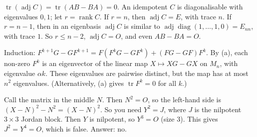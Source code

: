\documentclass[11pt,a4paper]{article}
\begin{document}
\(\operatorname{tr}(\operatorname{adj}C)=\operatorname{tr}(AB-BA)=0\). An idempotent \(C\) is diagonalisable with eigenvalues \(0,1\); let \(r=\operatorname{rank}C\).
If \(r=n\), then \(\operatorname{adj}C=E\), with trace \(n\). If \(r=n-1\), then in an eigenbasis \(\operatorname{adj}C\) is similar to \(\operatorname{adj}\operatorname{diag}(1,\dots,1,0)=E_{nn}\), with trace \(1\). So \(r\le n-2\), \(\operatorname{adj}C=O\), and even \(AB-BA=O\).

Induction: \(F^{k+1}G-GF^{k+1}=F(F^kG-GF^k)+(FG-GF)F^k\).
By (a), each non-zero \(F^k\) is an eigenvector of the linear map \(X\mapsto XG-GX\) on \(M_n\), with eigenvalue \(\alpha k\). These eigenvalues are pairwise distinct, but the map has at most \(n^2\) eigenvalues. (Alternatively, (a) gives \(\operatorname{tr}F^k=0\) for all \(k\).)

Call the matrix in the middle \(N\). Then \(N^2=O\), so the left-hand side is \((X-N)^2-N^2=(X-N)^2\).
So you need \(Y^2=J\), where \(J\) is the nilpotent \(3\times3\) Jordan block. Then \(Y\) is nilpotent, so \(Y^3=O\) (size \(3\)). This gives \(J^2=Y^4=O\), which is false. Answer: no.
\end{document}

